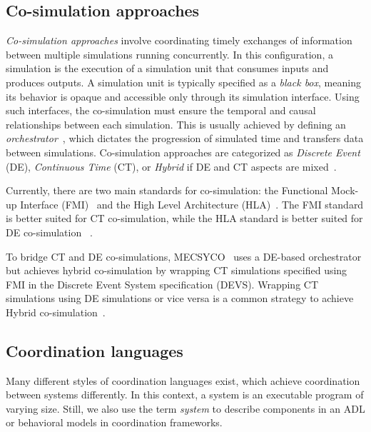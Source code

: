 \documentclass[runningheads]{llncs}
\begin{document}
\subsection{Co-simulation approaches} \label{subsec: cosim}

\textit{Co-simulation approaches} involve coordinating timely exchanges of information between multiple simulations running concurrently. In this configuration, a simulation is the execution of a simulation unit that consumes inputs and produces outputs. A simulation unit is typically specified as a \textit{black box}, meaning its behavior is opaque and accessible only through its simulation interface.
Using such interfaces, the co-simulation must ensure the temporal and causal relationships between each simulation. This is usually achieved by defining an \textit{orchestrator}~\cite{gomesCoSimulationSurvey2019}, which dictates the progression of simulated time and transfers data between simulations.
Co-simulation approaches are categorized as \textit{Discrete Event} (DE), \textit{Continuous Time} (CT), or \textit{Hybrid} if DE and CT aspects are mixed~\cite{gomesCoSimulationSurvey2019}.

Currently, there are two main standards for co-simulation: the Functional Mock-up Interface (FMI)~\cite{modelisarFunctionalMockupInterface2023} and the High Level Architecture (HLA)~\cite{dahmannHighLevelArchitecture1997}.
The FMI standard is better suited for CT co-simulation, while the HLA standard is better suited for DE co-simulation ~\cite{gomesCoSimulationSurvey2019,liboniComplexSystemsCosimulation2021}.

To bridge CT and DE co-simulations, MECSYCO~\cite{camusHybridCosimulationFMUs2016,camusCosimulationCyberphysicalSystems2018} uses a DE-based orchestrator but achieves hybrid co-simulation by wrapping CT simulations specified using FMI in the Discrete Event System specification (DEVS).
Wrapping CT simulations using DE simulations or vice versa is a common strategy to achieve Hybrid co-simulation~\cite{gomesCoSimulationSurvey2019}.

\subsection{Coordination languages} \label{subsec: coordlang}
Many different styles of coordination languages exist, which achieve coordination between systems differently.
In this context, a system is an executable program of varying size.
Still, we also use the term \textit{system} to describe components in an ADL or behavioral models in coordination frameworks.
\end{document}
